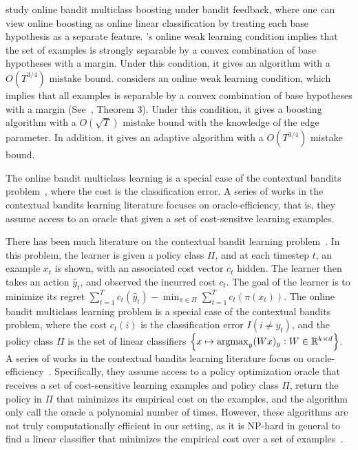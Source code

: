 \citet{Chen-Lin-Lu-2014, Zhang-Jung-Tewari-2018} study online bandit multiclass
boosting under bandit feedback, where one can view online boosting as online
linear classification by treating each base hypothesis as a separate feature.
\citet{Chen-Lin-Lu-2014}'s online weak learning condition implies that the set
of examples is strongly separable by a convex combination of base hypotheses
with a margin. Under this condition, it gives an algorithm with a $O(T^{3/4})$
mistake bound. \citet{Zhang-Jung-Tewari-2018} considers an online weak learning
condition, which implies that all examples is separable by a convex combination
of base hypotheses with a margin (See~\cite{Mukherjee-Schapire-2013}, Theorem
3). Under this condition, it gives a boosting algorithm with a $O(\sqrt{T})$
mistake bound with the knowledge of the edge parameter. In addition, it gives an
adaptive algorithm with a $O(T^{3/4})$ mistake bound.

The online bandit multiclass learning is a special case of the contextual
bandits problem~\citep{Auer-2003, Langford-Zhang-2008}, where the cost is the
classification error. A series of works in the contextual bandits learning
literature focuses on oracle-efficiency, that is, they assume access to an
oracle that given a set of cost-sensitve learning examples.

There has been much literature on the contextual bandit learning
problem~\citep{Auer-2003, Langford-Zhang-2008}. In this problem, the learner is
given a policy class $\Pi$, and at each timestep $t$, an example $x_t$ is shown,
with an associated cost vector $c_t$ hidden. The learner then takes an action
$\hat{y}_t$, and observed the incurred cost $c_t$. The goal of the learner is to
minimize its regret $\sum_{t=1}^T c_t(\hat{y}_t) - \min_{\pi \in \Pi}
\sum_{t=1}^T c_t(\pi(x_t))$. The online bandit multiclass learning problem is a
special case of the contextual bandits problem, where the cost $c_t(i)$ is the
classification error $I(i \neq y_t)$, and the policy class $\Pi$ is the set of
linear classifiers $\cbr{x \mapsto \argmax_y (Wx)_y: W \in \R^{k \times d}}$. A
series of works in the contextual bandits learning literature focus on
oracle-efficiency~\citep{Dudik-Hsu-Kale-Karampatziakis-Langford-Reyzin-Zhang-2011,
Agarwal-Hsu-Kale-Langford-Li-Schapire-2014, Rakhlin-Sridharan-2016,
Syrgkanis-Krishnamurthy-Schapire-2016,
Syrgkanis-Luo-Krishnamurthy-Schapire-2016}. Specifically, they assume access to
a policy optimization oracle that receives a set of cost-sensitive learning
examples and policy class $\Pi$, return the policy in $\Pi$ that minimizes its
empirical cost on the examples, and the algorithm only call the oracle a
polynomial number of times. However, these algorithms are not truly
computationally efficient in our setting, as it is NP-hard in general to find a
linear classifier that minimizes the empirical cost over a set of
examples~\citep{Arora-Babai-Stern-Sweedyk-1997}.

